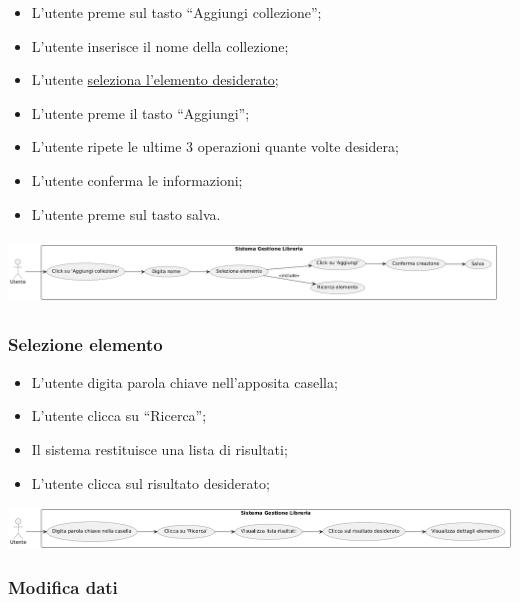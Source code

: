 \begin{itemize}
  \item
    L'utente preme sul tasto ``Aggiungi collezione'';
  \item
    L'utente inserisce il nome della collezione;
  \item
    L'utente \underline{seleziona l'elemento desiderato;}
  \item
    L'utente preme il tasto ``Aggiungi'';
  \item
    L'utente ripete le ultime 3 operazioni quante volte desidera;
  \item
    L'utente conferma le informazioni;
  \item
    L'utente preme sul tasto salva.
\end{itemize}

\begin{center}
  \includegraphics[width=5.10903in,height=0.70625in]{media/useCase2.png}
\end{center}

\subsubsection{Selezione elemento}\label{selezione-elemento}

\begin{itemize}
  \item
    L'utente digita parola chiave nell'apposita casella;
  \item
    L'utente clicca su ``Ricerca'';
  \item
    Il sistema restituisce una lista di risultati;
  \item
    L'utente clicca sul risultato desiderato;
\end{itemize}

\begin{center}
  \includegraphics[width=\textwidth]{media/useCase3.png}
\end{center}

\subsubsection{Modifica dati}\label{modifica-dati}

